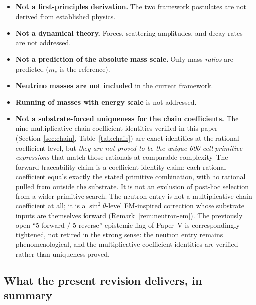 \documentclass[12pt]{article}
\begin{document}
\begin{itemize}
    \item \textbf{Not a first-principles derivation.} The two framework postulates are not derived from established physics.
    \item \textbf{Not a dynamical theory.} Forces, scattering amplitudes, and decay rates are not addressed.
    \item \textbf{Not a prediction of the absolute mass scale.} Only mass \textit{ratios} are predicted ($m_e$ is the reference).
    \item \textbf{Neutrino masses are not included} in the current framework.
    \item \textbf{Running of masses with energy scale} is not addressed.
    \item \textbf{Not a substrate-forced uniqueness for the chain coefficients.} The nine multiplicative chain-coefficient identities verified in this paper (Section~\ref{sec:chain}, Table~\ref{tab:chain}) are exact identities at the rational-coefficient level, but \emph{they are not proved to be the unique 600-cell primitive expressions} that match those rationals at comparable complexity. The forward-traceability claim is a coefficient-identity claim: each rational coefficient equals exactly the stated primitive combination, with no rational pulled from outside the substrate. It is not an exclusion of post-hoc selection from a wider primitive search. The neutron entry is not a multiplicative chain coefficient at all; it is a $\sin^2\theta$-level EM-inspired correction whose substrate inputs are themselves forward (Remark~\ref{rem:neutron-em}). The previously open ``5-forward / 5-reverse'' epistemic flag of Paper~V is correspondingly tightened, not retired in the strong sense: the neutron entry remains phenomenological, and the multiplicative coefficient identities are verified rather than uniqueness-proved.
\end{itemize}

\subsection*{What the present revision delivers, in summary}
\end{document}
